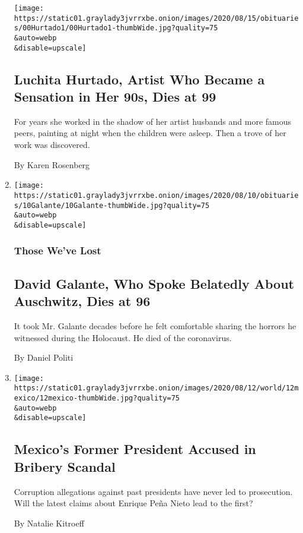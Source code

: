 \begin{enumerate}
  \texttt{[image: https://static01.graylady3jvrrxbe.onion/images/2020/08/15/obituaries/00Hurtado1/00Hurtado1-thumbWide.jpg?quality=75\\\&auto=webp\\\&disable=upscale]}

  \hypertarget{luchita-hurtado-artist-who-became-a-sensation-in-her-90s-dies-at-99}{%
  \subsection{Luchita Hurtado, Artist Who Became a Sensation in Her 90s,
  Dies at
  99}\label{luchita-hurtado-artist-who-became-a-sensation-in-her-90s-dies-at-99}}

  For years she worked in the shadow of her artist husbands and more
  famous peers, painting at night when the children were asleep. Then a
  trove of her work was discovered.

  By Karen Rosenberg
\item
  \href{/2020/08/13/obituaries/david-galante-dead-coronavirus.html}{}

  \texttt{[image: https://static01.graylady3jvrrxbe.onion/images/2020/08/10/obituaries/10Galante/10Galante-thumbWide.jpg?quality=75\\\&auto=webp\\\&disable=upscale]}

  \hypertarget{those-weve-lost}{%
  \subsubsection{Those We've Lost}\label{those-weve-lost}}

  \hypertarget{david-galante-who-spoke-belatedly-about-auschwitz-dies-at-96}{%
  \subsection{David Galante, Who Spoke Belatedly About Auschwitz, Dies
  at
  96}\label{david-galante-who-spoke-belatedly-about-auschwitz-dies-at-96}}

  It took Mr. Galante decades before he felt comfortable sharing the
  horrors he witnessed during the Holocaust. He died of the coronavirus.

  By Daniel Politi
\item
  \href{/2020/08/12/world/americas/Mexico-Pena-Nieto-bribes.html}{}

  \texttt{[image: https://static01.graylady3jvrrxbe.onion/images/2020/08/12/world/12mexico/12mexico-thumbWide.jpg?quality=75\\\&auto=webp\\\&disable=upscale]}

  \hypertarget{mexicos-former-president-accused-in-bribery-scandal}{%
  \subsection{Mexico's Former President Accused in Bribery
  Scandal}\label{mexicos-former-president-accused-in-bribery-scandal}}

  Corruption allegations against past presidents have never led to
  prosecution. Will the latest claims about Enrique Peña Nieto lead to
  the first?

  By Natalie Kitroeff
\end{enumerate}

